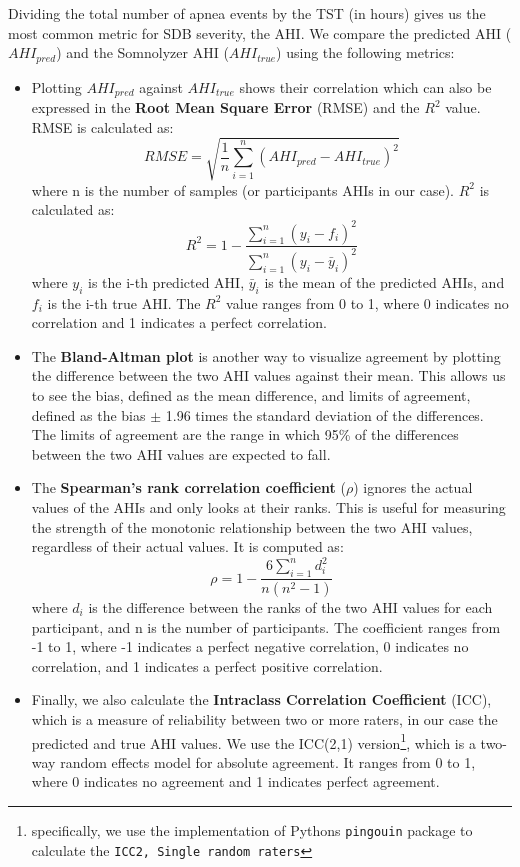 Dividing the total number of apnea events by the TST (in hours) gives us the most common metric for SDB severity, the AHI. We compare the predicted AHI ($AHI_{pred}$) and the Somnolyzer AHI ($AHI_{true}$) using the following metrics:

\begin{itemize}
    \item Plotting $AHI_{pred}$ against $AHI_{true}$ shows their correlation which can also be expressed in the \textbf{Root Mean Square Error} (RMSE) and the \textbf{$R^2$} value. RMSE is calculated as:
    \begin{equation}
        RMSE = \sqrt{\frac{1}{n}\sum_{i=1}^{n}(AHI_{pred} - AHI_{true})^2} 
    \end{equation}
    where n is the number of samples (or participants AHIs in our case). $R^2$ is calculated as:
    \begin{equation}
        R^2 = 1 - \frac{\sum_{i=1}^{n}(y_i - f_i)^2}{\sum_{i=1}^{n}(y_i - \bar{y}_i)^2}
    \end{equation}
    where $y_i$ is the i-th predicted AHI, $\bar{y}_i$ is the mean of the predicted AHIs, and $f_i$ is the i-th true AHI. The $R^2$ value ranges from 0 to 1, where 0 indicates no correlation and 1 indicates a perfect correlation.
    \item The \textbf{Bland-Altman plot} is another way to visualize agreement by plotting the difference between the two AHI values against their mean. This allows us to see the bias, defined as the mean difference, and limits of agreement, defined as the bias $\pm$ 1.96 times the standard deviation of the differences. The limits of agreement are the range in which 95\% of the differences between the two AHI values are expected to fall.
    \item The \textbf{Spearman's rank correlation coefficient} ($\rho$) ignores the actual values of the AHIs and only looks at their ranks. This is useful for measuring the strength of the monotonic relationship between the two AHI values, regardless of their actual values. It is computed as:
    \begin{equation}
        \rho = 1 - \frac{6\sum_{i=1}^{n}d_i^2}{n(n^2-1)}
    \end{equation}
    where $d_i$ is the difference between the ranks of the two AHI values for each participant, and n is the number of participants.
    The coefficient ranges from -1 to 1, where -1 indicates a perfect negative correlation, 0 indicates no correlation, and 1 indicates a perfect positive correlation.
    \item Finally, we also calculate the \textbf{Intraclass Correlation Coefficient} (ICC), which is a measure of reliability between two or more raters, in our case the predicted and true AHI values. We use the ICC(2,1) version\footnote{specifically, we use the implementation of Pythons \texttt{pingouin} package to calculate the \texttt{ICC2, Single random raters}}, which is a two-way random effects model for absolute agreement. It ranges from 0 to 1, where 0 indicates no agreement and 1 indicates perfect agreement.
\end{itemize}

